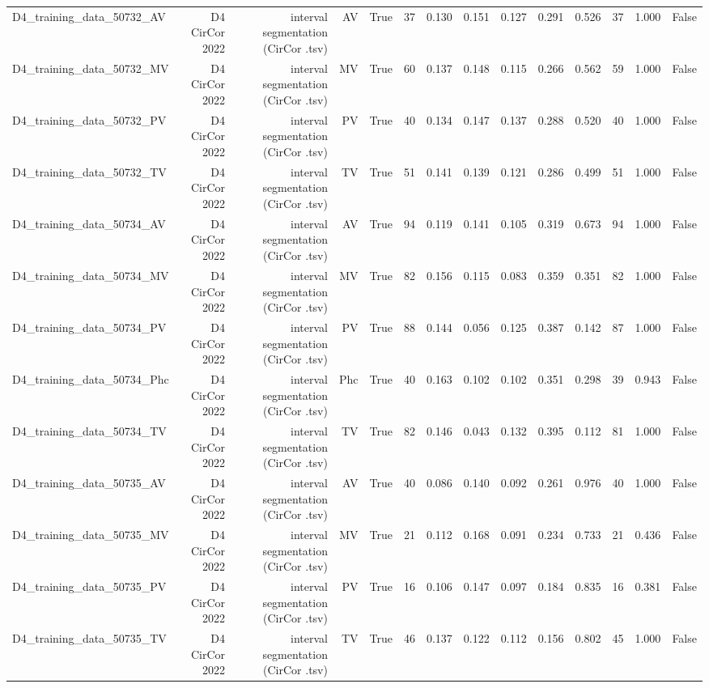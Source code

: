 \begin{table}[htbp]
\begin{tabular}{lrrrrrrrrrrrrr}
    D4\_training\_data\_50732\_AV & D4 CirCor 2022 & interval segmentation (CirCor .tsv) & AV & True & 37 & 0.130 & 0.151 & 0.127 & 0.291 & 0.526 & 37 & 1.000 & False \\
    D4\_training\_data\_50732\_MV & D4 CirCor 2022 & interval segmentation (CirCor .tsv) & MV & True & 60 & 0.137 & 0.148 & 0.115 & 0.266 & 0.562 & 59 & 1.000 & False \\
    D4\_training\_data\_50732\_PV & D4 CirCor 2022 & interval segmentation (CirCor .tsv) & PV & True & 40 & 0.134 & 0.147 & 0.137 & 0.288 & 0.520 & 40 & 1.000 & False \\
    D4\_training\_data\_50732\_TV & D4 CirCor 2022 & interval segmentation (CirCor .tsv) & TV & True & 51 & 0.141 & 0.139 & 0.121 & 0.286 & 0.499 & 51 & 1.000 & False \\
    D4\_training\_data\_50734\_AV & D4 CirCor 2022 & interval segmentation (CirCor .tsv) & AV & True & 94 & 0.119 & 0.141 & 0.105 & 0.319 & 0.673 & 94 & 1.000 & False \\
    D4\_training\_data\_50734\_MV & D4 CirCor 2022 & interval segmentation (CirCor .tsv) & MV & True & 82 & 0.156 & 0.115 & 0.083 & 0.359 & 0.351 & 82 & 1.000 & False \\
    D4\_training\_data\_50734\_PV & D4 CirCor 2022 & interval segmentation (CirCor .tsv) & PV & True & 88 & 0.144 & 0.056 & 0.125 & 0.387 & 0.142 & 87 & 1.000 & False \\
    D4\_training\_data\_50734\_Phc & D4 CirCor 2022 & interval segmentation (CirCor .tsv) & Phc & True & 40 & 0.163 & 0.102 & 0.102 & 0.351 & 0.298 & 39 & 0.943 & False \\
    D4\_training\_data\_50734\_TV & D4 CirCor 2022 & interval segmentation (CirCor .tsv) & TV & True & 82 & 0.146 & 0.043 & 0.132 & 0.395 & 0.112 & 81 & 1.000 & False \\
    D4\_training\_data\_50735\_AV & D4 CirCor 2022 & interval segmentation (CirCor .tsv) & AV & True & 40 & 0.086 & 0.140 & 0.092 & 0.261 & 0.976 & 40 & 1.000 & False \\
    D4\_training\_data\_50735\_MV & D4 CirCor 2022 & interval segmentation (CirCor .tsv) & MV & True & 21 & 0.112 & 0.168 & 0.091 & 0.234 & 0.733 & 21 & 0.436 & False \\
    D4\_training\_data\_50735\_PV & D4 CirCor 2022 & interval segmentation (CirCor .tsv) & PV & True & 16 & 0.106 & 0.147 & 0.097 & 0.184 & 0.835 & 16 & 0.381 & False \\
    D4\_training\_data\_50735\_TV & D4 CirCor 2022 & interval segmentation (CirCor .tsv) & TV & True & 46 & 0.137 & 0.122 & 0.112 & 0.156 & 0.802 & 45 & 1.000 & False \\

\end{tabular}
\end{table}
